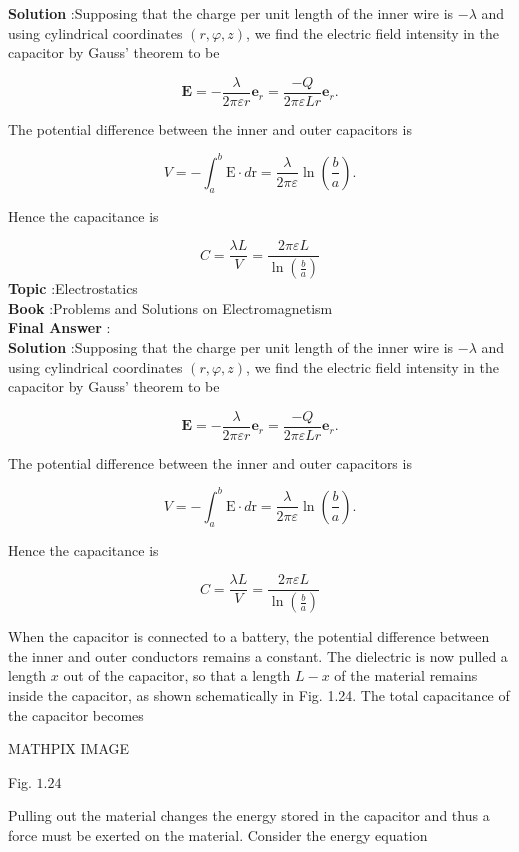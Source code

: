 \documentclass[10pt]{article}
\begin{document}
\textbf{Solution} :Supposing that the charge per unit length of the inner wire is $-\lambda$ and using cylindrical coordinates $(r, \varphi, z)$, we find the electric field intensity in the capacitor by Gauss' theorem to be

$$
\mathbf{E}=-\frac{\lambda}{2 \pi \varepsilon r} \mathbf{e}_{r}=\frac{-Q}{2 \pi \varepsilon L r} \mathbf{e}_{r} .
$$

 The potential difference between the inner and outer capacitors is

$$
V=-\int_{a}^{b} \mathrm{E} \cdot d \mathrm{r}=\frac{\lambda}{2 \pi \varepsilon} \ln \left(\frac{b}{a}\right) .
$$

Hence the capacitance is

$$
C=\frac{\lambda L}{V}=\frac{2 \pi \varepsilon L}{\ln \left(\frac{b}{a}\right)}
$$
\textbf{Topic} :Electrostatics\\
\textbf{Book} :Problems and Solutions on Electromagnetism\\
\textbf{Final Answer} :\\


\textbf{Solution} :Supposing that the charge per unit length of the inner wire is $-\lambda$ and using cylindrical coordinates $(r, \varphi, z)$, we find the electric field intensity in the capacitor by Gauss' theorem to be

$$
\mathbf{E}=-\frac{\lambda}{2 \pi \varepsilon r} \mathbf{e}_{r}=\frac{-Q}{2 \pi \varepsilon L r} \mathbf{e}_{r} .
$$

 The potential difference between the inner and outer capacitors is

$$
V=-\int_{a}^{b} \mathrm{E} \cdot d \mathrm{r}=\frac{\lambda}{2 \pi \varepsilon} \ln \left(\frac{b}{a}\right) .
$$

Hence the capacitance is

$$
C=\frac{\lambda L}{V}=\frac{2 \pi \varepsilon L}{\ln \left(\frac{b}{a}\right)}
$$

 When the capacitor is connected to a battery, the potential difference between the inner and outer conductors remains a constant. The dielectric is now pulled a length $x$ out of the capacitor, so that a length $L-x$ of the material remains inside the capacitor, as shown schematically in Fig. 1.24. The total capacitance of the capacitor becomes

MATHPIX IMAGE

Fig. $1.24$

Pulling out the material changes the energy stored in the capacitor and thus a force must be exerted on the material. Consider the energy equation
\end{document}
